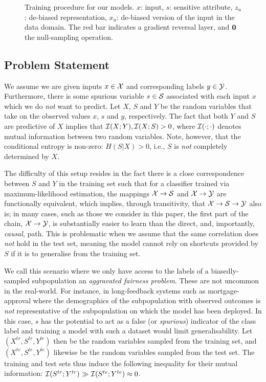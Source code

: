 \begin{figure}[tb]
{        \label{fig:cvae_diagram}
    }
    \hfill
    \caption{
        Training procedure for our models. $x$: input, $s$: sensitive attribute, $z_u$: de-biased
        representation, $x_u$: de-biased version of the input in the data domain. The red bar
        indicates a gradient reversal layer, and ${\bm{0}}$ the null-sampling operation.
    }%
    \label{fig:model-diagrams}
\end{figure}

\subsection{Problem Statement}
%
\noindent We assume we are given inputs $x \in {\mathcal{X}}$ and corresponding labels $y \in {\mathcal{Y}}$.
Furthermore, there is some spurious variable $s \in {\mathcal{S}}$ associated with each input $x$ which
we do \emph{not} want to predict. 
%
Let $X$, $S$ and $Y$ be the random variables that take on the observed values $x$, $s$ and $y$,
respectively. 
%
The fact that both $Y$ and $S$ are predictive of $X$ implies that ${\mathcal{I}}(X;Y), {\mathcal{I}}(X;S) > 0$,
where ${\mathcal{I}}(\cdot ;\cdot)$ denotes mutual information between two random variables.
%
Note, however, that the conditional entropy is non-zero: \( H(S|X) > 0 \), i.e., $S$ is \emph{not}
completely determined by $X$.

The difficulty of this setup resides in the fact there is a close correspondence between $S$ and
$Y$ in the training set such that for a classifier trained via maximum-likelihood estimation, the
mappings \( {\mathcal{X}} \to {\mathcal{S}} \) and \({\mathcal{X}} \to {\mathcal{Y}} \) are functionally equivalent, which implies, through
transitivity, that \({\mathcal{X}} \to {\mathcal{S}} \to {\mathcal{Y}} \) also is; in many cases, such as those we consider in
this paper, the first part of the chain, \( {\mathcal{X}} \to {\mathcal{Y}} \), is substantially easier to learn than
the direct, and, importantly, \emph{causal}, path.
%
This is problematic when we assume that the same correlation does \emph{not} hold in the test set,
meaning the model cannot rely on shortcuts provided by $S$ if it is to generalise from the training
set.

We call this scenario where we only have access to the labels of a biasedly-sampled subpopulation
an \emph{aggravated fairness problem}. 
%
These are not uncommon in the real-world. 
%
For instance, in long-feedback systems such as mortgage-approval where the demographics of the
subpopulation with observed outcomes is \emph{not} representative of the subpopulation on which the
model has been deployed. 
%
In this case, $s$ has the potential to act as a false (or \emph{spurious}) indicator of the class
label and training a model with such a dataset would limit generalisability. 
%
Let \( (X^{tr}, S^{tr}, Y^{tr}) \) then be the random variables sampled from the training set, and
\( (X^{te}, S^{te}, Y^{te}) \) likewise be the random variables sampled from the test set.
%
The training and test sets thus induce the following inequality for their mutual information:
\( {\mathcal{I}}(S^{tr}; Y^{tr}) \gg {\mathcal{I}}(S^{te}; Y^{te}) \approx 0 \).

